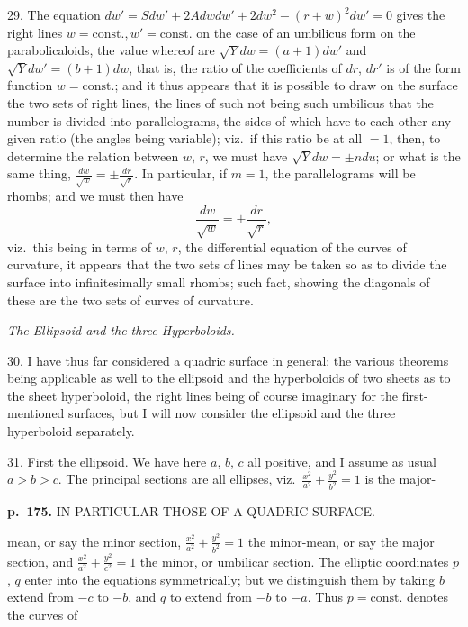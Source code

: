 \documentclass[11pt,a4paper]{book}
\begin{document}
29.  The equation $dw' = Sdw' + 2Adwdw' + 2dw^2 - (r + w)^2 dw' = 0$ gives the right lines $w = \mathrm{const.}, w' = \mathrm{const.}$ on the case of an umbilicus form on the parabolicaloids, the value whereof are $\sqrt{Y} dw = (a + 1) dw'$ and $\sqrt{Y} dw' = (b + 1) dw$, that is, the ratio of the coefficients of $dr$, $dr'$ is of the form function $w = \mathrm{const.}$; and it thus appears that it is possible to draw on the surface the two sets of right lines, the lines of such not being such umbilicus that the number is divided into parallelograms, the sides of which have to each other any given ratio (the angles being variable); viz.\ if this ratio be at all $= 1$, then, to determine the relation between $w$, $r$, we must have $\sqrt{Y} dw = \pm n du$; or what is the same thing, $\frac{dw}{\sqrt{w}} = \pm \frac{dr}{\sqrt{r}}$. In particular, if $m = 1$, the parallelograms will be rhombs; and we must then have
\[
\frac{dw}{\sqrt{w}} = \pm \frac{dr}{\sqrt{r}},
\]
viz.\ this being in terms of $w$, $r$, the differential equation of the curves of curvature,
it appears that the two sets of lines may be taken so as to divide the surface into
infinitesimally small rhombs; such fact, showing the diagonals of these are the two
sets of curves of curvature.

\textit{The Ellipsoid and the three Hyperboloids.}

30. I have thus far considered a quadric surface in general; the various theorems
being applicable as well to the ellipsoid and the hyperboloids of two sheets as to the
sheet hyperboloid, the right lines being of course imaginary for the first-mentioned
surfaces, but I will now consider the ellipsoid and the three hyperboloid separately.

31. First the ellipsoid.  We have here $a$, $b$, $c$ all positive, and I assume as usual
$a > b > c$.  The principal sections are all ellipses, viz.\ $\frac{x^2}{a^2} + \frac{y^2}{b^2} = 1$ is the major-

\clearpage

\noindent
\textbf{p.~175.}  IN PARTICULAR THOSE OF A QUADRIC SURFACE.

mean, or say the minor section, $\frac{x^2}{a^2} + \frac{y^2}{b^2} = 1$ the minor-mean, or say the major section, and $\frac{x^2}{a^2} + \frac{y^2}{c^2} = 1$ the minor, or umbilicar section. The elliptic coordinates $p$, $q$ enter into the equations symmetrically; but we distinguish them by taking $b$ extend from $-c$ to $-b$, and $q$ to extend from $-b$ to $-a$.  Thus $p = \mathrm{const.}$ denotes the curves of
\end{document}
